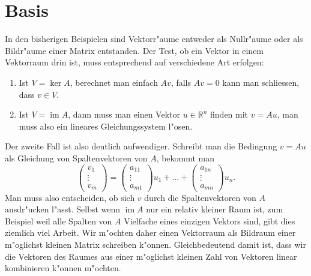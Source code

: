 \section{Basis}
In den bisherigen Beispielen sind Vektorr"aume entweder als Nullr"aume oder
als Bildr"aume einer Matrix entstanden.
Der Test, ob ein Vektor in einem
Vektorraum drin ist, muss entsprechend auf verschiedene Art erfolgen:
\begin{enumerate}
\item Ist $V=\operatorname{ker}A$, berechnet man einfach $Av$, falls $Av=0$
kann man schliessen, dass $v\in V$.
\item Ist $V=\operatorname{im}A$, dann muss man einen Vektor $u\in\mathbb R^n$
finden mit $v=Au$, man muss also ein lineares Gleichungssystem l"osen.
\end{enumerate}
Der zweite Fall ist also deutlich aufwendiger.
Schreibt man die Bedingung
$v=Au$ als Gleichung von Spaltenvektoren von $A$, bekommt man
\[
\begin{pmatrix}v_1\\\vdots\\v_m\end{pmatrix}
=
\begin{pmatrix}a_{11}\\\vdots\\a_{m1}\end{pmatrix}u_1+\dots+
\begin{pmatrix}a_{1n}\\\vdots\\a_{mn}\end{pmatrix}u_n.
\]
Man muss also entscheiden, ob sich $v$ durch die Spaltenvektoren von
$A$ ausdr"ucken l"asst.
Selbst wenn $\operatorname{im}A$ nur ein
relativ kleiner Raum ist, zum Beispiel weil alle Spalten von $A$
Vielfache eines
einzigen Vektors sind, gibt dies ziemlich viel Arbeit.
Wir m"ochten
daher einen Vektorraum als Bildraum einer m"oglichst kleinen Matrix
schreiben k"onnen.
Gleichbedeutend damit ist, dass wir die Vektoren
des Raumes aus einer m"oglichst kleinen Zahl von Vektoren linear
kombinieren k"onnen m"ochten.

